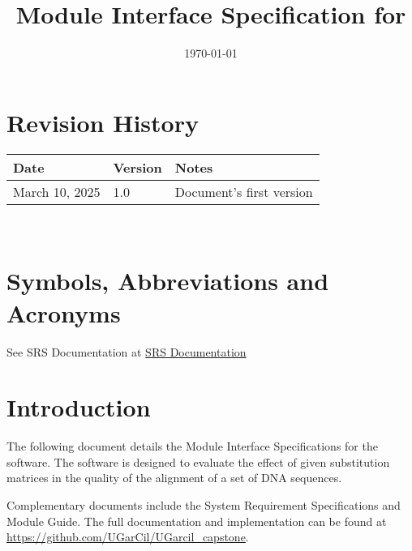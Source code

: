 \documentclass[12pt, titlepage]{article}
\begin{document}
\title{Module Interface Specification for \progname{}}

\author{\authname}

\date{\today}

\maketitle


\section{Revision History}

\begin{tabularx}{\textwidth}{p{3cm}p{2cm}X}
\toprule {\bf Date} & {\bf Version} & {\bf Notes}\\
\midrule
March 10, 2025 & 1.0 & Document's first version\\
\bottomrule
\end{tabularx}

~\newpage

\section{Symbols, Abbreviations and Acronyms}
See SRS Documentation at \href{https://github.com/UGarCil/UGarcil_capstone/blob/main/docs/SRS/SRS.pdf}{SRS Documentation}


\newpage

\tableofcontents

\newpage


\section{Introduction}

The following document details the Module Interface Specifications for
the \progname software. The software is designed to evaluate the effect of 
given substitution matrices in the quality of the alignment of a set of DNA sequences.

Complementary documents include the System Requirement Specifications
and Module Guide.  The full documentation and implementation can be
found at \url{https://github.com/UGarCil/UGarcil_capstone}.
\end{document}
